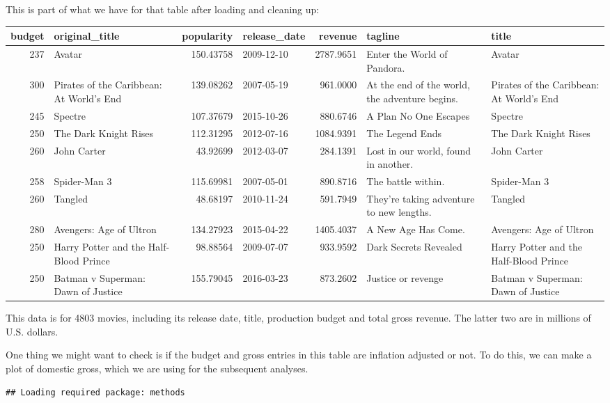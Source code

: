 \documentclass[12pt,]{book}
\theoremstyle{definition}
\theoremstyle{definition}
\theoremstyle{definition}
\theoremstyle{remark}
\begin{document}
This is part of what we have for that table after loading and cleaning
up:

\begin{tabular}{r|l|r|l|r|l|l}
\hline
budget & original\_title & popularity & release\_date & revenue & tagline & title\\
\hline
237 & Avatar & 150.43758 & 2009-12-10 & 2787.9651 & Enter the World of Pandora. & Avatar\\
\hline
300 & Pirates of the Caribbean: At World's End & 139.08262 & 2007-05-19 & 961.0000 & At the end of the world, the adventure begins. & Pirates of the Caribbean: At World's End\\
\hline
245 & Spectre & 107.37679 & 2015-10-26 & 880.6746 & A Plan No One Escapes & Spectre\\
\hline
250 & The Dark Knight Rises & 112.31295 & 2012-07-16 & 1084.9391 & The Legend Ends & The Dark Knight Rises\\
\hline
260 & John Carter & 43.92699 & 2012-03-07 & 284.1391 & Lost in our world, found in another. & John Carter\\
\hline
258 & Spider-Man 3 & 115.69981 & 2007-05-01 & 890.8716 & The battle within. & Spider-Man 3\\
\hline
260 & Tangled & 48.68197 & 2010-11-24 & 591.7949 & They're taking adventure to new lengths. & Tangled\\
\hline
280 & Avengers: Age of Ultron & 134.27923 & 2015-04-22 & 1405.4037 & A New Age Has Come. & Avengers: Age of Ultron\\
\hline
250 & Harry Potter and the Half-Blood Prince & 98.88564 & 2009-07-07 & 933.9592 & Dark Secrets Revealed & Harry Potter and the Half-Blood Prince\\
\hline
250 & Batman v Superman: Dawn of Justice & 155.79045 & 2016-03-23 & 873.2602 & Justice or revenge & Batman v Superman: Dawn of Justice\\
\hline
\end{tabular}

This data is for 4803 movies, including its release date, title,
production budget and total gross revenue. The latter two are in
millions of U.S. dollars.

One thing we might want to check is if the budget and gross entries in
this table are inflation adjusted or not. To do this, we can make a plot
of domestic gross, which we are using for the subsequent analyses.

\begin{verbatim}
## Loading required package: methods
\end{verbatim}
\end{document}
